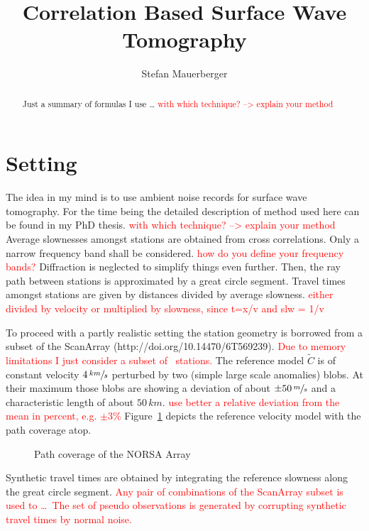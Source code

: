 \documentclass[11pt]{article}
\title{Correlation Based Surface Wave Tomography}
\author{Stefan Mauerberger}
\newcommand\worries[1]{\textcolor{red}{#1}}
\begin{document}
\maketitle
\begin{abstract}
    Just a summary of formulas I use \dots
\worries{with which technique? --> explain your method}
\end{abstract}

\section{Setting}


The idea in my mind is to use ambient noise records for surface wave tomography.
For the time being the detailed description of method used here can be found in my PhD thesis.
\worries{with which technique? --> explain your method}
Average slownesses amongst stations are obtained from cross correlations.
Only a narrow frequency band shall be considered.
\worries{how do you define your frequency bands?}
Diffraction is neglected to simplify things even further.
Then, the ray path between stations is approximated by a great circle segment.
Travel times amongst stations are given by distances divided by average slowness.
\worries{either divided by velocity or multiplied by slowness, since t=x/v and slw = 1/v}

To proceed with a partly realistic setting the station geometry is borrowed from a subset of the ScanArray (http://doi.org/10.14470/6T569239).
\worries{Due to memory limitations I just consider a subset of \SFWnobs\ stations.}
The reference model $\tilde C$ is of constant velocity $4\,\sfrac{km}s$ perturbed by two (simple large scale anomalies) blobs.
At their maximum those blobs are showing a deviation of about $\pm 50\,\sfrac ms$ and a characteristic length of about $50\,km$. \worries{use better a relative deviation from the mean in percent, e.g. $\pm 3\%$}
Figure~\ref{fig:path_coverage} depicts the reference velocity model with the path coverage atop.

\begin{figure}
    \centering
    
    \caption{Path coverage of the NORSA Array}
    \label{fig:path_coverage}
\end{figure}

Synthetic travel times are obtained by integrating the reference slowness along the great circle segment.
\worries{Any pair of combinations of the ScanArray subset is used to \dots\
The set of pseudo observations is generated by corrupting synthetic travel times by normal noise.}
\end{document}
